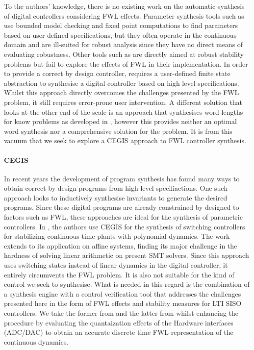 \documentclass{sig-alternate-05-2015}
\begin{document}
To the authors' knowledge, there is no existing work on the automatic synthesis of digital controllers considering FWL effects. Parameter synthesis tools such as \cite{cimatti2013parameter} use bounded model checking and fixed point computations to find parameters based on user defined specifications, but they often operate in the continuous domain and are ill-suited for robust analysis since they have no direct means of evaluating robustness. Other tools such as \cite{economakos2016automated} are directly aimed at robust stability problems but fail to explore the effects of FWL in their implementation.
In order to provide a correct by design controller, \cite{alur2016compositional} requires a user-defined finite state abstraction to synthesise a digital controller based on high level specifications. Whilst this approach directly overcomes the challenges presented by the FWL problem, it still requires error-prone user intervention. A different solution that looks at the other end of the scale is an approach that synthesises word lengths for know problems as developed in \cite{jha2013swati}, however this provides neither an optimal word synthesis nor a comprehensive solution for the problem.
It is from this vacuum that we seek to explore a CEGIS approach to FWL controller synthesis.

\paragraph{CEGIS}

In recent years the development of program synthesis has found many ways to obtain correct by design programs from high level specifiactions. One such approach \cite{itzhaky2010simple} looks to inductively synthesise invariants to generate the desired programs. Since these digital programs are already constrained by designed to factors such as FWL, these approaches are ideal for the synthesis of parametric controllers.
In \cite{DBLP:conf/cdc/RavanbakhshS15}, the authors use CEGIS for the synthesis of switching controllers for stabilizing continuous-time plants with polynomial dynamics. The work extends to its application on affine systems, finding its major challenge in the hardness of solving linear arithmetic on present SMT solvers. Since this approach uses switching states instead of linear dynamics in the digital controller, it entirely circumvents the FWL problem. It is also not suitable for the kind of control we seek to synthesise.
What is needed in this regard is the combination of a synthesis engine with a control verification tool that addresses the challenges presented here in the form of FWL effects and stability measures for LTI SISO controllers. We take the former from \cite{} and the latter from \cite{daes20161} whilst enhancing the procedure by evaluating the quantaization effects of the Hardware interfaces (ADC/DAC) to obtain an accurate discrete time FWL representation of the continuous dynamics.
 
\end{document}
